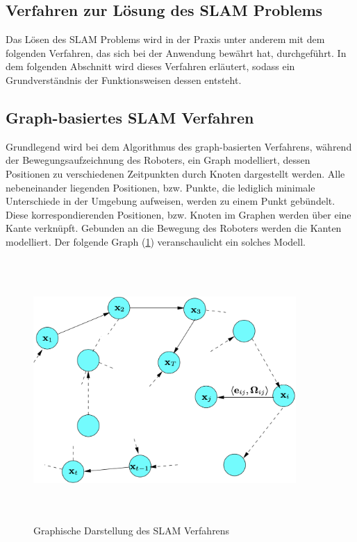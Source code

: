 \subsection{Verfahren zur Lösung des SLAM Problems}
Das Lösen des \acs{SLAM} Problems wird in der Praxis unter anderem mit dem folgenden Verfahren, das sich bei der Anwendung bewährt hat, durchgeführt. In dem 
folgenden Abschnitt wird dieses Verfahren erläutert, sodass ein Grundverständnis der Funktionsweisen dessen entsteht. 
\subsection*{Graph-basiertes SLAM Verfahren}
Grundlegend wird bei dem Algorithmus des graph-basierten Verfahrens, während der Bewegungsaufzeichnung des Roboters, ein Graph modelliert, 
dessen Positionen zu verschiedenen Zeitpunkten durch Knoten dargestellt werden. Alle nebeneinander liegenden Positionen, bzw. Punkte, die 
lediglich minimale Unterschiede in der Umgebung aufweisen, werden zu einem Punkt gebündelt. Diese korrespondierenden Positionen, bzw. 
Knoten im Graphen werden über eine Kante verknüpft. Gebunden an die Bewegung des Roboters werden die Kanten modelliert. Der folgende Graph 
(\ref{pic:GraphSLAM}) veranschaulicht ein solches Modell.
\begin{figure}[hbt!]
    \centering
    \includegraphics[width=10cm,height=10cm,keepaspectratio]{2Grundlagen/Bilder/graph_SLAM.png}
    \caption{Graphische Darstellung des SLAM Verfahrens \cite{graphSLAM.2010}}
    \label{pic:GraphSLAM}
\end{figure}
